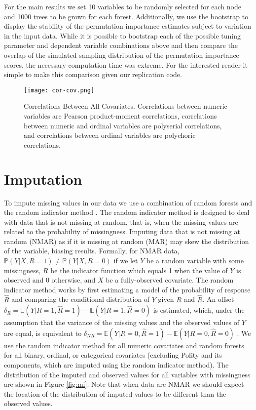 \documentclass[11pt]{article}
\begin{document}
For the main results we set 10 variables to be randomly selected for each node and 1000 trees to be grown for each forest. Additionally, we use the bootstrap to display the stability of the permutation importance estimates subject to variation in the input data. While it is possible to bootstrap each of the possible tuning parameter and dependent variable combinations above and then compare the overlap of the simulated sampling distribution of the permutation importance scores, the necessary computation time was extreme. For the interested reader it simple to make this comparison given our replication code.

\begin{figure}[!htpb]
\texttt{[image: cor-cov.png]}
\caption{Correlations Between All Covariates. Correlations between numeric variables are Pearson product-moment correlations, correlations between numeric and ordinal variables are polyserial correlations, and correlations between ordinal variables are polychoric correlations.} 
\label{fig:cor-cov}
\end{figure}

\section*{Imputation}

To impute missing values in our data we use a combination of random forests and the random indicator method \citep{buuren2011mice,jolani2012}. The random indicator method is designed to deal with data that is not missing at random, that is, when the missing values are related to the probability of missingness. Imputing data that is not missing at random (NMAR) as if it is missing at random (MAR) may skew the distribution of the variable, biasing results. Formally, for NMAR data, $\mathbb{P}(Y|X, R=1) \neq \mathbb{P}(Y|X, R=0)$ if we let $Y$ be a random variable with some missingness, $R$ be the indicator function which equals 1 when the value of $Y$ is observed and 0 otherwise, and $X$ be a fully-observed covariate. The random indicator method works by first estimating a model of the probability of response $\hat{R}$ and comparing the conditional distribution of $Y$ given $R$ and $\hat{R}$. An offset $\delta_R = \mathbb{E}(Y|R=1,\hat{R}=1) - \mathbb{E}(Y|R=1,\hat{R}=0)$ is estimated, which, under the assumption that the variance of the missing values and the observed values of $Y$ are equal, is equivalent to $\delta_{NR} = \mathbb{E}(Y|R=0,\hat{R}=1) - \mathbb{E}(Y|R=0,\hat{R}=0)$ \citep{jolani2012}. We use the random indicator method for all numeric covariates and random forests for all binary, ordinal, or categorical covariates (excluding Polity and its components, which are imputed using the random indicator method). The distribution of the imputed and observed values for all variables with missingness are shown in Figure \ref{fig:mi}. Note that when data are NMAR we should expect the location of the distribution of imputed values to be different than the observed values.
\end{document}
